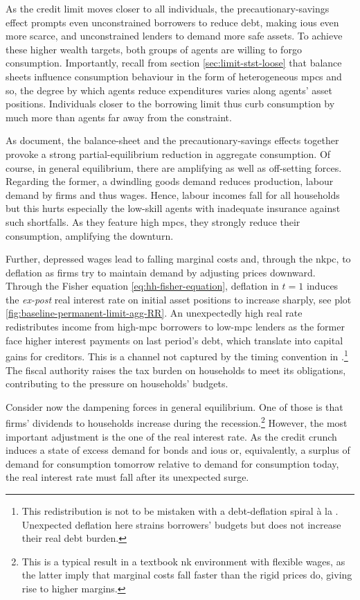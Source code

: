 \documentclass[a4paper,12pt]{article} %
\numberwithin{equation}{section} %
\numberwithin{figure}{section}
\numberwithin{table}{section}
\begin{document}
As the credit limit moves closer to all individuals, the precautionary-savings effect prompts even unconstrained borrowers to reduce debt, making \Gls{iou}s even more scarce, and unconstrained lenders to demand more safe assets. To achieve these higher wealth targets, both groups of agents are willing to forgo consumption. Importantly, recall from section \ref{sec:limit-stst-loose} that balance sheets influence consumption behaviour in the form of heterogeneous \Gls{mpc}s and so, the degree by which agents reduce expenditures varies along agents' asset positions. Individuals closer to the borrowing limit thus curb consumption by much more than agents far away from the constraint.

As \textcite{gl2017} document, the balance-sheet and the precautionary-savings effects together provoke a strong partial-equilibrium reduction in aggregate consumption. Of course, in general equilibrium, there are amplifying as well as off-setting forces. Regarding the former, a dwindling goods demand reduces production, labour demand by firms and thus wages. Hence, labour incomes fall for all households but this hurts especially the low-skill agents with inadequate insurance against such shortfalls. As they feature high \Gls{mpc}s, they strongly reduce their consumption, amplifying the downturn.

Further, depressed wages lead to falling marginal costs and, through the \Gls{nkpc}, to deflation as firms try to maintain demand by adjusting prices downward. Through the Fisher equation \eqref{eq:hh-fisher-equation}, deflation in $t=1$ induces the \textit{ex-post} real interest rate on initial asset positions to increase sharply, see plot \ref{fig:baseline-permanent-limit-agg-RR}. An unexpectedly high real rate redistributes income from high-\Gls{mpc} borrowers to low-\Gls{mpc} lenders as the former face higher interest payments on last period's debt, which translate into capital gains for creditors. This is a channel not captured by the timing convention in \textcite{gl2017}.\footnote{This redistribution is not to be mistaken with a debt-deflation spiral à la \textcite{fisher1933}. Unexpected deflation here strains borrowers' budgets but does not increase their real debt burden.} The fiscal authority raises the tax burden on households to meet its obligations, contributing to the pressure on households' budgets.

Consider now the dampening forces in general equilibrium. One of those is that firms' dividends to households increase during the recession.\footnote{This is a typical result in a textbook \Gls{nk} environment with flexible wages, as the latter imply that marginal costs fall faster than the rigid prices do, giving rise to higher margins.} However, the most important adjustment is the one of the real interest rate. As the credit crunch induces a state of excess demand for bonds and \Gls{iou}s or, equivalently, a surplus of demand for consumption tomorrow relative to demand for consumption today, the real interest rate must fall after its unexpected surge. 
\end{document}
